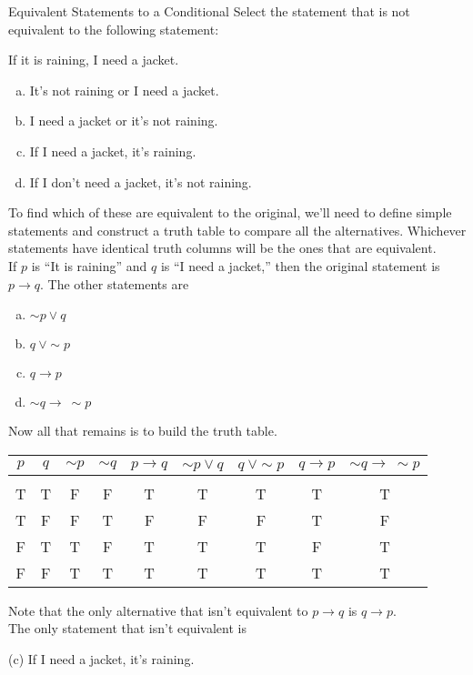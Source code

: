 \begin{example}[https://www.youtube.com/watch?v=2pMpgmywnp8]{Equivalent Statements to a Conditional}
Select the statement that is not equivalent to the following statement:
\begin{center}
If it is raining, I need a jacket.
\end{center}
\begin{enumerate}[(a)]
\item It's not raining or I need a jacket.
\item I need a jacket or it's not raining.
\item If I need a jacket, it's raining.
\item If I don't need a jacket, it's not raining.
\end{enumerate}

\sol
To find which of these are equivalent to the original, we'll need to define simple statements and construct a truth table to compare all the alternatives.  Whichever statements have identical truth columns will be the ones that are equivalent.\\

If $p$ is ``It is raining'' and $q$ is ``I need a jacket,'' then the original statement is $p \to q$.  The other statements are 
\begin{enumerate}[(a)]
\item $\sim p \vee q$
\item $q\ \vee \sim p$
\item $q \to p$
\item $\sim q \to\ \sim p$
\end{enumerate}

Now all that remains is to build the truth table.
\begin{center}
\begin{tabular}{|c c c c c c c c c|}
\hline
$p$ & $q$ & $\sim p$ & $\sim q$ & $p \to q$ & $\sim p \vee q$ & $q\ \vee \sim p$ & $q \to p$ & $\sim q \to\ \sim p$\\
\hline
& & & & & & & & \\
T & T & F & F & T & T & T & T & T\\
T & F & F & T & F & F & F & T & F\\
F & T & T & F & T & T & T & F & T\\
F & F & T & T & T & T & T & T & T\\
\hline
\end{tabular}
\end{center}

Note that the only alternative that isn't equivalent to $p \to q$ is $q \to p$.\\

The only statement that isn't equivalent is 
\begin{center}
(c) If I need a jacket, it's raining.
\end{center}
\end{example}

